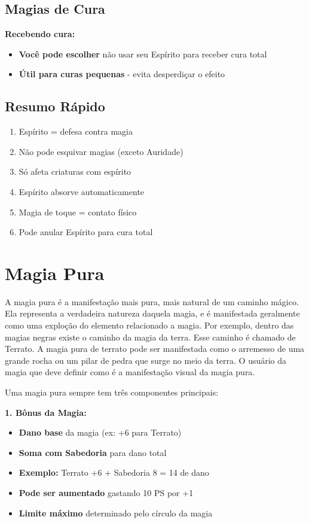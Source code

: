 \subsection{Magias de Cura}

\textbf{Recebendo cura:}
\begin{itemize}
    \item \textbf{Você pode escolher} não usar seu Espírito para receber cura total
    \item \textbf{Útil para curas pequenas} - evita desperdiçar o efeito
\end{itemize}

\subsection{Resumo Rápido}
\begin{enumerate}
    \item Espírito = defesa contra magia
    \item Não pode esquivar magias (exceto Auridade)
    \item Só afeta criaturas com espírito
    \item Espírito absorve automaticamente
    \item Magia de toque = contato físico
    \item Pode anular Espírito para cura total
\end{enumerate}


\section{Magia Pura}

A magia pura é a manifestação mais pura, mais natural de um caminho mágico. Ela representa a verdadeira natureza daquela magia, e é manifestada geralmente como uma exploção do elemento relacionado a magia. Por exemplo, dentro das magias negras existe o caminho da magia da terra. Esse caminho é chamado de Terrato. A magia pura de terrato pode ser manifestada como o arremesso de uma grande rocha ou um pilar de pedra que surge no meio da terra. O usuário da magia que deve definir como é a manifestação visual da magia pura. 

Uma magia pura sempre tem três componentes principais:

\textbf{1. Bônus da Magia:}
\begin{itemize}
    \item \textbf{Dano base} da magia (ex: +6 para Terrato)
    \item \textbf{Soma com Sabedoria} para dano total
    \item \textbf{Exemplo:} Terrato +6 + Sabedoria 8 = 14 de dano
    \item \textbf{Pode ser aumentado} gastando 10 PS por +1
    \item \textbf{Limite máximo} determinado pelo círculo da magia
\end{itemize}

